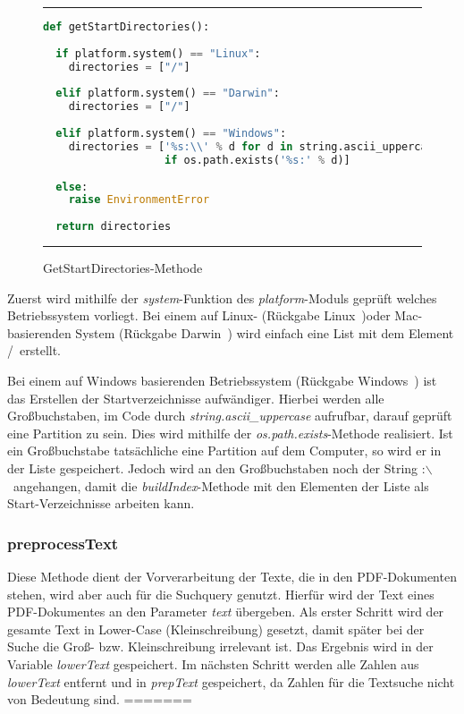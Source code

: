 \begin{figure}
	\rule{\textwidth}{0.4pt}
	\begin{lstlisting}[language=Python]
def getStartDirectories():
	
  if platform.system() == "Linux":
    directories = ["/"]
	
  elif platform.system() == "Darwin":
    directories = ["/"]
	
  elif platform.system() == "Windows":
    directories = ['%s:\\' % d for d in string.ascii_uppercase
                   if os.path.exists('%s:' % d)]
	
  else:
    raise EnvironmentError
	
  return directories
	\end{lstlisting}
	\rule{\textwidth}{0.4pt}
	\caption{GetStartDirectories-Methode}
	\label{fig:start}
\end{figure}

Zuerst wird mithilfe der \textit{system}-Funktion des \textit{platform}-Moduls geprüft welches Betriebssystem vorliegt. Bei einem auf Linux- (Rückgabe \glqq Linux\grqq\ )oder Mac-basierenden System (Rückgabe \glqq Darwin\grqq\ ) wird einfach eine List mit dem Element \glqq /\grqq\ erstellt.

Bei einem auf Windows basierenden Betriebssystem (Rückgabe \glqq Windows\grqq\ ) ist das Erstellen der Startverzeichnisse aufwändiger. Hierbei werden alle Großbuchstaben, im Code durch \textit{string.ascii\_uppercase} aufrufbar, darauf geprüft eine Partition zu sein. Dies wird mithilfe der \textit{os.path.exists}-Methode realisiert. Ist ein Großbuchstabe tatsächliche eine Partition auf dem Computer, so wird er in der Liste gespeichert. Jedoch wird an den Großbuchstaben noch der String \glqq :$\backslash$\grqq\ angehangen, damit die \textit{buildIndex}-Methode mit den Elementen der Liste als Start-Verzeichnisse arbeiten kann.

\subsubsection{preprocessText}\label{preprocess}
Diese Methode dient der Vorverarbeitung der Texte, die in den PDF-Dokumenten stehen, wird aber auch für die Suchquery genutzt. Hierfür wird der Text eines PDF-Dokumentes an den Parameter \textit{text} übergeben. Als erster Schritt wird der gesamte Text in Lower-Case (Kleinschreibung) gesetzt, damit später bei der Suche die Groß- bzw. Kleinschreibung irrelevant ist. Das Ergebnis wird in der Variable \textit{lowerText} gespeichert. Im nächsten Schritt werden alle Zahlen aus \textit{lowerText} entfernt und in \textit{prepText} gespeichert, da Zahlen für die Textsuche nicht von Bedeutung sind.
=======
